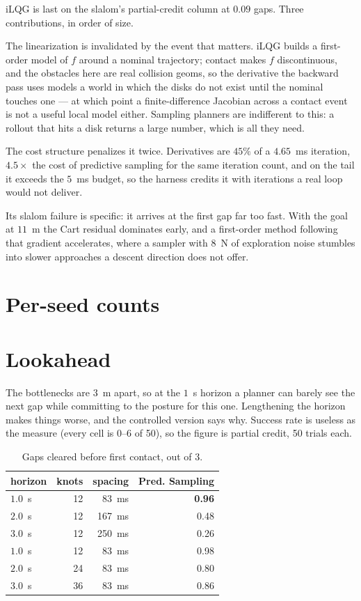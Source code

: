 \documentclass[conference]{IEEEtran}
\begin{document}
iLQG is last on the slalom's partial-credit column at $0.09$ gaps. Three
contributions, in order of size.

The linearization is invalidated by the event that matters. iLQG builds a
first-order model of $f$ around a nominal trajectory; contact makes $f$
discontinuous, and the obstacles here are real collision geoms, so the
derivative the backward pass uses models a world in which the disks do not exist
until the nominal touches one --- at which point a finite-difference Jacobian
across a contact event is not a useful local model either. Sampling planners are
indifferent to this: a rollout that hits a disk returns a large number, which is
all they need.

The cost structure penalizes it twice. Derivatives are $45\%$ of a $4.65$~ms
iteration, $4.5\times$ the cost of predictive sampling for the same iteration
count, and on the tail it exceeds the $5$~ms budget, so the harness credits it
with iterations a real loop would not deliver.

Its slalom failure is specific: it arrives at the first gap far too fast. With
the goal at $11$~m the Cart residual dominates early, and a first-order method
following that gradient accelerates, where a sampler with $8$~N of exploration
noise stumbles into slower approaches a descent direction does not offer.

\section{Per-seed counts}
\label{app:seeds}



\section{Lookahead}
\label{app:horizon}

The bottlenecks are $3$~m apart, so at the $1$~s horizon a planner can barely
see the next gap while committing to the posture for this one. Lengthening the
horizon makes things worse, and the controlled version says why. Success rate is
useless as the measure (every cell is 0--6 of 50), so the figure is partial
credit, 50 trials each.

\begin{table}[h]
\caption{Gaps cleared before first contact, out of 3.}
\label{tab:horizon}
\centering
\begin{tabular}{@{}lrrr@{}}
\toprule
horizon & knots & spacing & Pred. Sampling \\
\midrule
$1.0$~s & 12 & 83~ms  & \textbf{0.96} \\
$2.0$~s & 12 & 167~ms & 0.48 \\
$3.0$~s & 12 & 250~ms & 0.26 \\
\midrule
$1.0$~s & 12 & 83~ms  & 0.98 \\
$2.0$~s & 24 & 83~ms  & 0.80 \\
$3.0$~s & 36 & 83~ms  & 0.86 \\
\bottomrule
\end{tabular}
\end{table}
\end{document}
